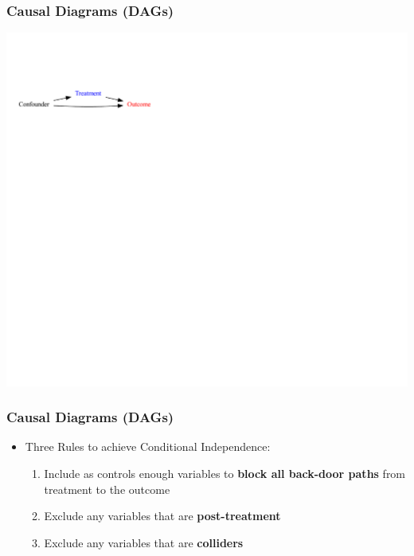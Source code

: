 \documentclass[xcolor=x11names,compress]{beamer}\usepackage[]{graphicx}\usepackage[]{color}
\newenvironment{knitrout}{}{} %
\renewcommand{\(}{\begin{columns}}
\renewcommand{\)}{\end{columns}}
\newcommand{\<}[1]{\begin{column}{#1}}
\renewcommand{\>}{\end{column}}
\begin{document}
\begin{frame}
\frametitle{Causal Diagrams (DAGs)}
\begin{knitrout}
\color{fgcolor}
\includegraphics[width=1.8\linewidth]{figure/Dag2-1} 

\end{knitrout}
\end{frame}

\begin{frame}
\frametitle{Causal Diagrams (DAGs)}
\begin{itemize}
\item Three Rules to achieve Conditional Independence:
\begin{enumerate}
\item Include as controls enough variables to \textbf{block all back-door paths} from treatment to the outcome
\pause
\item Exclude any variables that are \textbf{post-treatment}
\pause
\item Exclude any variables that are \textbf{colliders}
\end{enumerate}
\end{itemize}
\end{frame}
\end{document}
